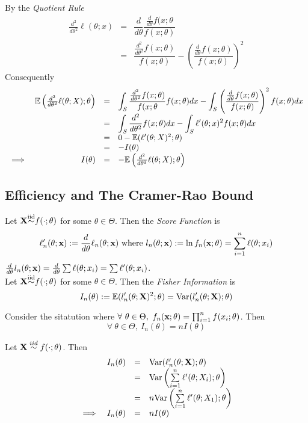 \documentclass[11pt,a4paper]{article}
\begin{document}
By the \textit{Quotient Rule}
\[\begin{array}{rcl}
\frac{d^2}{d\theta^2}\ell(\theta;x)&=&\dfrac{d}{d\theta}\dfrac{\frac{d}{d\theta}f(x;\theta}{f(x;\theta)}\\
&=&\dfrac{\frac{d^2}{d\theta^2}f(x;\theta)}{f(x;\theta)}-\left(\dfrac{\frac{d}{d\theta}f(x;\theta)}{f(x;\theta)}\right)^2
\end{array}\]
Consequently
\[\begin{array}{rrcl}
&\mathbb{E}\left(\frac{d^2}{d\theta^2}\ell(\theta;X);\theta\right)&=&{\displaystyle\int_S\frac{\frac{d^2}{d\theta^2}f(x;\theta)}{f(x;\theta}f(x;\theta)dx-\int_S\left(\frac{\frac{d}{d\theta}f(x;\theta)}{f(x;\theta)}\right)^2f(x;\theta)dx}\\
&&=&{\displaystyle\int_S\frac{d^2}{d\theta^2}f(x;\theta)dx-\int_S\ell'(\theta;x)^2f(x;\theta)dx}\\
&&=&0-\mathbb{E}(\ell'(\theta;X)^2;\theta)\\
&&=&-I(\theta)\\
\implies&I(\theta)&=&-\mathbb{E}\left(\frac{d^2}{d\theta^2}\ell(\theta;X);\theta\right)
\end{array}\]
\proved

\subsection{Efficiency and The Cramer-Rao Bound}

Let $\textbf{X}{\overset{\text{iid}}{\sim}}f(\cdot;\theta)$ for some $\theta\in\Theta$. Then the \textit{Score Function} is
$$\ell'_n(\theta;\textbf{x}):=\frac{d}{d\theta}\ell_n(\theta;\textbf{x})\text{ where }l_n(\theta;\textbf{x}):=\ln f_n(\textbf{x};\theta)=\sum_{i=1}^n\ell(\theta;x_i)$$
\nb $\frac{d}{d\theta}l_n(\theta;\textbf{x})=\frac{d}{d\theta}\sum\ell(\theta;x_i)=\sum\ell'(\theta;x_i)$.\\

Let $\textbf{X}{\overset{\text{iid}}{\sim}}f(\cdot;\theta)$ for some $\theta\in\Theta$. Then the \textit{Fisher Information} is
$$I_n(\theta):=\mathbb{E}(l'_n(\theta;\textbf{X})^2;\theta)=\mathrm{Var}(l'_n(\theta;\textbf{X});\theta)$$

Consider the sitatution where $\forall\ \theta\in\Theta,\ f_n(\x;\theta)=\prod_{i=1}^nf(x_i;\theta)$. Then
$$\forall\ \theta\in\Theta,\ I_n(\theta)=nI(\theta)$$

Let $\textbf{X}\overset{iid}{\sim}f(\cdot;\theta)$. Then
\[\begin{array}{rrcl}
&I_n(\theta)&=&\mathrm{Var}(\ell'_n(\theta;\textbf{X});\theta)\\
&&=&\mathrm{Var}\left(\sum\limits_{i=1}^n\ell'(\theta;X_i);\theta\right)\\
&&=&n\mathrm{Var}\left(\sum\limits_{i=1}^n\ell'(\theta;X_1);\theta\right)\\
\implies&I_n(\theta)&=&nI(\theta)
\end{array}\]
\proved
\end{document}
